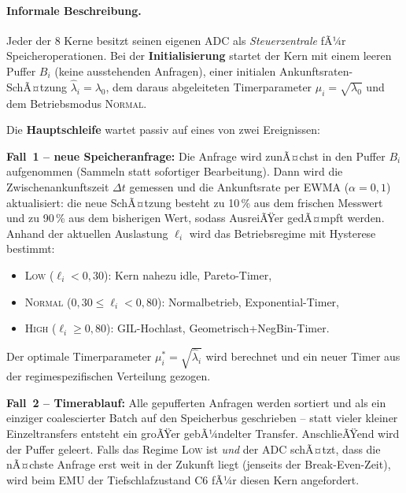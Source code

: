 ﻿\documentclass[a4paper,12pt]{scrreprt}
\theoremstyle{definition}
\begin{document}
	\paragraph{Informale Beschreibung.}
	Jeder der 8 Kerne besitzt seinen eigenen ADC als \emph{Steuerzentrale} fÃ¼r Speicheroperationen.
	Bei der \textbf{Initialisierung} startet der Kern mit einem leeren Puffer $B_i$ (keine ausstehenden Anfragen),
	einer initialen Ankunftsraten-SchÃ¤tzung $\hat\lambda_i = \lambda_0$, dem daraus abgeleiteten Timerparameter
	$\mu_i = \sqrt{\lambda_0}$ und dem Betriebsmodus \textsc{Normal}.

	Die \textbf{Hauptschleife} wartet passiv auf eines von zwei Ereignissen:

	\textbf{Fall~1 -- neue Speicheranfrage:}
	Die Anfrage wird zunÃ¤chst in den Puffer $B_i$ aufgenommen (Sammeln statt sofortiger Bearbeitung).
	Dann wird die Zwischenankunftszeit $\Delta t$ gemessen und die Ankunftsrate per EWMA ($\alpha = 0{,}1$)
	aktualisiert: die neue SchÃ¤tzung besteht zu 10\,\% aus dem frischen Messwert und zu 90\,\% aus dem
	bisherigen Wert, sodass AusreiÃŸer gedÃ¤mpft werden.
	Anhand der aktuellen Auslastung $\ell_i$ wird das Betriebsregime mit Hysterese bestimmt:
	\begin{itemize}
		\item \textsc{Low} ($\ell_i < 0{,}30$): Kern nahezu idle, Pareto-Timer,
		\item \textsc{Normal} ($0{,}30 \le \ell_i < 0{,}80$): Normalbetrieb, Exponential-Timer,
		\item \textsc{High} ($\ell_i \ge 0{,}80$): GIL-Hochlast, Geometrisch+NegBin-Timer.
	\end{itemize}
	Der optimale Timerparameter $\mu_i^* = \sqrt{\hat\lambda_i}$ wird berechnet und ein neuer Timer
	aus der regimespezifischen Verteilung gezogen.

	\textbf{Fall~2 -- Timerablauf:}
	Alle gepufferten Anfragen werden sortiert und als ein einziger coalescierter Batch auf den Speicherbus
	geschrieben -- statt vieler kleiner Einzeltransfers entsteht ein groÃŸer gebÃ¼ndelter Transfer.
	AnschlieÃŸend wird der Puffer geleert. Falls das Regime \textsc{Low} ist \emph{und} der ADC schÃ¤tzt,
	dass die nÃ¤chste Anfrage erst weit in der Zukunft liegt (jenseits der Break-Even-Zeit), wird
	beim EMU der Tiefschlafzustand C6 fÃ¼r diesen Kern angefordert.
\end{document}
